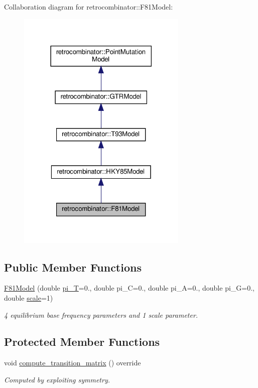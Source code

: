 Collaboration diagram for retrocombinator\+:\+:F81\+Model\+:
\nopagebreak
\begin{figure}[H]
\begin{center}
\leavevmode
\includegraphics[width=230pt]{classretrocombinator_1_1F81Model__coll__graph}
\end{center}
\end{figure}
\subsection*{Public Member Functions}
\begin{DoxyCompactItemize}
\item 
\hyperlink{classretrocombinator_1_1F81Model_a80c3357497cdc6b91ff4c408750b47bb}{F81\+Model} (double \hyperlink{classretrocombinator_1_1GTRModel_ab002dbc62f8e8fbfc94558dd94166bd8}{pi\+\_\+T}=0., double pi\+\_\+C=0., double pi\+\_\+A=0., double pi\+\_\+G=0., double \hyperlink{classretrocombinator_1_1PointMutationModel_a3258dfbdae0f2614cdc66f13ae028b46}{scale}=1)
\begin{DoxyCompactList}\small\item\em 4 equilibrium base frequency parameters and 1 scale parameter. \end{DoxyCompactList}\end{DoxyCompactItemize}
\subsection*{Protected Member Functions}
\begin{DoxyCompactItemize}
\item 
\mbox{\label{classretrocombinator_1_1F81Model_a5bb9c63e55c4f8f7b9573281ff6ee610}} 
void \hyperlink{classretrocombinator_1_1F81Model_a5bb9c63e55c4f8f7b9573281ff6ee610}{compute\+\_\+transition\+\_\+matrix} () override
\begin{DoxyCompactList}\small\item\em Computed by exploiting symmetry. \end{DoxyCompactList}\end{DoxyCompactItemize}
